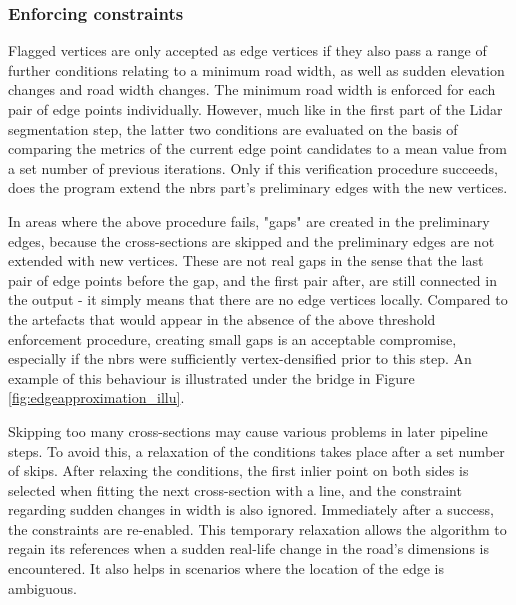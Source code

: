 \subsubsection{Enforcing constraints}

Flagged vertices are only accepted as edge vertices if they also pass a range of further conditions relating to a minimum road width, as well as sudden elevation changes and road width changes. The minimum road width is enforced for each pair of edge points individually. However, much like in the first part of the Lidar segmentation step, the latter two conditions are evaluated on the basis of comparing the metrics of the current edge point candidates to a mean value from a set number of previous iterations. Only if this verification procedure succeeds, does the program extend the \ac{nbrs} part's preliminary edges with the new vertices.

In areas where the above procedure fails, "gaps" are created in the preliminary edges, because the cross-sections are skipped and the preliminary edges are not extended with new vertices. These are not real gaps in the sense that the last pair of edge points before the gap, and the first pair after, are still connected in the output - it simply means that there are no edge vertices locally. Compared to the artefacts that would appear in the absence of the above threshold enforcement procedure, creating small gaps is an acceptable compromise, especially if the \ac{nbrs} were sufficiently vertex-densified prior to this step. An example of this behaviour is illustrated under the bridge in Figure \ref{fig:edgeapproximation_illu}.

Skipping too many cross-sections may cause various problems in later pipeline steps. To avoid this, a relaxation of the conditions takes place after a set number of skips. After relaxing the conditions, the first inlier point on both sides is selected when fitting the next cross-section with a line, and the constraint regarding sudden changes in width is also ignored. Immediately after a success, the constraints are re-enabled. This temporary relaxation allows the algorithm to regain its references when a sudden real-life change in the road's dimensions is encountered. It also helps in scenarios where the location of the edge is ambiguous.

